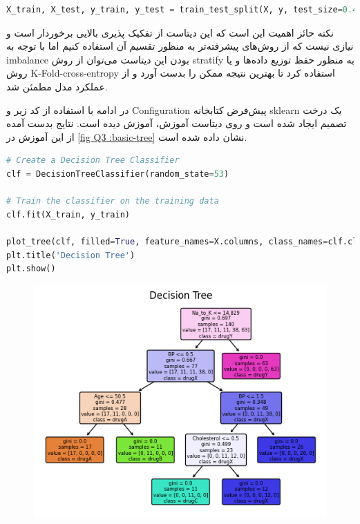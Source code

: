 \documentclass{article}
\begin{document}
\begin{LTR}
	\begin{lstlisting}[language=Python, caption=Data Selection]
		X_train, X_test, y_train, y_test = train_test_split(X, y, test_size=0.4, random_state=53)
	\end{lstlisting}
\end{LTR}

نکته حائز اهمیت این است که این دیتاست از تفکیک پذیری بالایی برخوردار است و نیازی نیست که از روش‌های پیشرفته‌تر به منظور تقسیم آن استفاده کنیم اما با توجه به 
imbalance
بودن این دیتاست می‌توان از روش 
stratify
به منظور حفظ توزیع داده‌ها و یا روش
K-Fold-cross-entropy
استفاده کرد تا بهترین نتیجه ممکن را بدست آورد و از عملکرد مدل مطمئن شد.

در ادامه با استفاده از کد زیر و 
Configuration
پیش‌فرض کتابخانه
sklearn
یک درخت تصمیم ایجاد شده است و روی دیتاست آموزش، آموزش دیده است. نتایج بدست آمده از این آموزش در 
\autoref{fig Q3 :basic-tree}
نشان داده شده است.
\begin{LTR}
	\begin{lstlisting}[language=Python, caption=Train Decision Tree]
# Create a Decision Tree Classifier
clf = DecisionTreeClassifier(random_state=53)

# Train the classifier on the training data
clf.fit(X_train, y_train)

plot_tree(clf, filled=True, feature_names=X.columns, class_names=clf.classes_, rounded=True)
plt.title('Decision Tree')
plt.show()
	\end{lstlisting}
\end{LTR}


\begin{figure}[H]
\centering
\includegraphics[width=1\linewidth]{"img/Q3/basic tree"}
\caption{}
\label{fig Q3 :basic-tree}
\end{figure}
\end{document}
